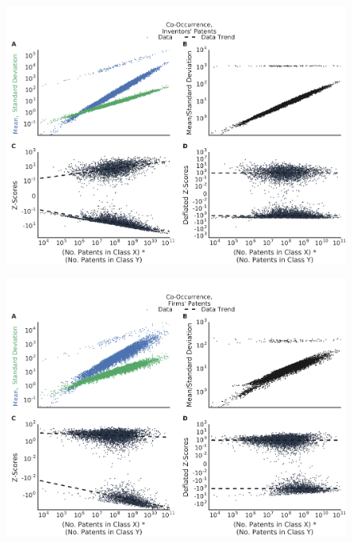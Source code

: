 \documentclass[]{svjour3}
\begin{document}
\begin{figure}[]
\begin{center}
\includegraphics[width=\textwidth]{figs/Z_Score_Inflation_Co-Occurrence_Inventors_Patents_IPC.png} 
\end{center}
\caption{}
\end{figure}

\begin{figure}[]
\begin{center}
\includegraphics[width=\textwidth]{figs/Z_Score_Inflation_Co-Occurrence_Firms_Patents_IPC.png} 
\end{center}
\caption{}
\end{figure}
\end{document}
